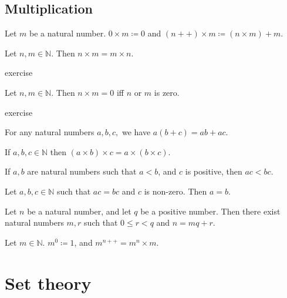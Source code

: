 \documentclass{article}
\begin{document}
\subsection{Multiplication}
\begin{definition}
	Let \(m\) be a natural number. \(0\times m\coloneq 0\) and \((n++)\times m\coloneq (n\times m)+m\).
\end{definition}
\begin{lemma}
	Let \(n,m\in\mathbb{N}\). Then \(n\times m=m\times n\).
	\begin{IEEEproof}
		exercise
	\end{IEEEproof}
\end{lemma}
\begin{lemma}
	Let \(n,m\in\mathbb{N}\). Then \(n\times m=0\) iff \(n\) or \(m\) is zero.
	\begin{IEEEproof}
		exercise
	\end{IEEEproof}
\end{lemma}
\begin{proposition}
	For any natural numbers \(a,b,c,\) we have \(a(b+c)=ab+ac\).
\end{proposition}
\begin{proposition}
	If \(a,b,c\in\mathbb{N}\) then \((a\times b)\times c=a\times(b\times c)\).
\end{proposition}
\begin{proposition}
	If \(a,b\) are natural numbers such that \(a<b\), and \(c\) is positive, then \(ac<bc\).
\end{proposition}
\begin{corollary}
	Let \(a,b,c\in\mathbb{N}\) such that \(ac=bc\) and \(c\) is non-zero. Then \(a=b\).
\end{corollary}
\begin{proposition}
	Let \(n\) be a natural number, and let \(q\) be a positive number. Then there exist natural numbers \(m,r\) such that \(0\leq r<q\) and \(n=mq+r\).
\end{proposition}
\begin{definition}
	Let \(m\in\mathbb{N}\). \(m^0\coloneq 1\), and \(m^{n++}=m^n\times m\).
\end{definition}
\section{Set theory}
\end{document}
